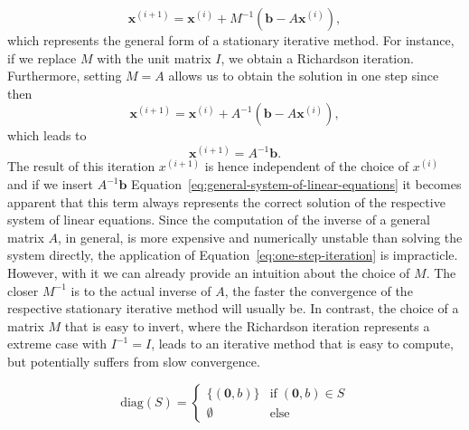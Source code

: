 \begin{equation}
	\bm{x}^{(i+1)} = \bm{x}^{(i)} + M^{-1}(\bm b - A \bm{x}^{(i)}),
	\label{eq:general-stationary-iterative-method}
\end{equation}
which represents the general form of a stationary iterative method.
For instance, if we replace $M$ with the unit matrix $I$, we obtain a Richardson iteration.
Furthermore, setting $M = A$ allows us to obtain the solution in one step since then
\begin{equation}
	\bm{x}^{(i+1)} = \bm{x}^{(i)} + A^{-1}(\bm b - A \bm{x}^{(i)}),
	\label{eq:one-step-iteration}
\end{equation}
which leads to
\begin{equation}
	\bm{x}^{(i+1)} = A^{-1}\bm b.
\end{equation}
The result of this iteration $x^{(i+1)}$ is hence independent of the choice of $x^{(i)}$ and if we insert $A^{-1}\bm b$ Equation~\eqref{eq:general-system-of-linear-equations} it becomes apparent that this term always represents the correct solution of the respective system of linear equations.
Since the computation of the inverse of a general matrix $A$, in general, is more expensive and numerically unstable than solving the system directly, the application of Equation~\eqref{eq:one-step-iteration} is impracticle.
However, with it we can already provide an intuition about the choice of $M$.
The closer $M^{-1}$ is to the actual inverse of $A$, the faster the convergence of the respective stationary iterative method will usually be.
In contrast, the choice of a matrix $M$ that is easy to invert, where the Richardson iteration represents a extreme case with $I^{-1} = I$, leads to an iterative method that is easy to compute, but potentially suffers from slow convergence.   



 

\begin{equation}
	\text{diag}(S) = \begin{cases}
		\{(\bm{0}, b) \} & \text{if} \; (\bm 0, b) \in S \\
		\emptyset & \text{else}
	\end{cases}
	\label{eq:stencil-diag}
\end{equation}